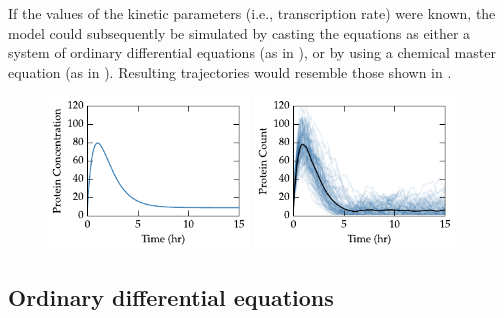 If the values of the kinetic parameters (i.e., transcription rate) were known, the model could subsequently be simulated by casting the equations as either a system of ordinary differential equations (as in ), or by using a chemical master equation (as in ). Resulting trajectories would resemble those shown in .

\begin{figure}[tbp]
  \centering
  \includegraphics[width=0.475\textwidth]{chap1/figures/sysbio_trajs1.pdf}
  \includegraphics[width=0.475\textwidth]{chap1/figures/sysbio_trajs2.pdf}
  \label{fig:extrajs}
\end{figure}

\subsection{Ordinary differential equations}\label{sec:odes}


